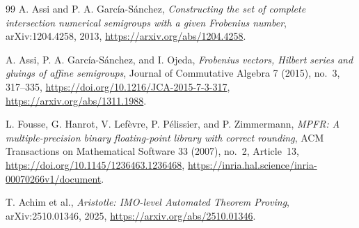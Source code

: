 \documentclass[11pt]{article}
\begin{document}
\begin{thebibliography}{99}
A. Assi and P. A. Garc\'ia-S\'anchez,
\emph{Constructing the set of complete intersection numerical semigroups
with a given Frobenius number},
arXiv:1204.4258, 2013,
\url{https://arxiv.org/abs/1204.4258}.

A. Assi, P. A. Garc\'ia-S\'anchez, and I. Ojeda,
\emph{Frobenius vectors, Hilbert series and gluings of affine semigroups},
Journal of Commutative Algebra 7 (2015), no.~3, 317--335,
\url{https://doi.org/10.1216/JCA-2015-7-3-317},
\url{https://arxiv.org/abs/1311.1988}.

L. Fousse, G. Hanrot, V. Lef\`evre, P. P\'elissier, and P. Zimmermann,
\emph{MPFR: A multiple-precision binary floating-point library with correct
rounding},
ACM Transactions on Mathematical Software 33 (2007), no.~2, Article~13,
\url{https://doi.org/10.1145/1236463.1236468},
\url{https://inria.hal.science/inria-00070266v1/document}.

T. Achim et al.,
\emph{Aristotle: IMO-level Automated Theorem Proving},
arXiv:2510.01346, 2025,
\url{https://arxiv.org/abs/2510.01346}.

\end{thebibliography}
\end{document}
